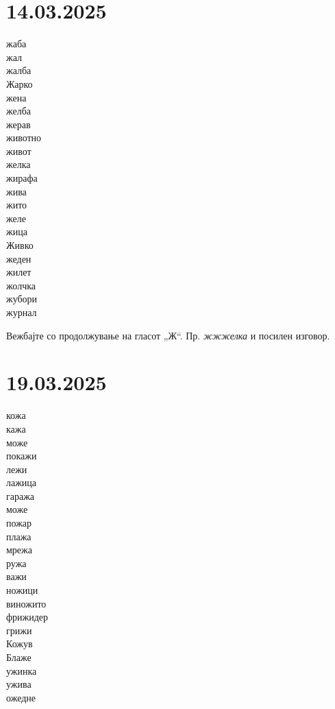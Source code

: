 \documentclass[a5paper,12pt]{article}
\newenvironment{activity}[1]{%
  \begin{tcolorbox}[colback=boxcolor,colframe=titlecolor,title={\textbf{#1}},fonttitle=\bfseries]
}{%
  \end{tcolorbox}
}
\newenvironment{instruction}{%
  \begin{tcolorbox}[colback=white,colframe=accentcolor,title={\textbf{Инструкции}},fonttitle=\bfseries] 
}{%
  \end{tcolorbox}
}
\begin{document}
\section{14.03.2025}
\begin{activity}{Зборчиња}
\begin{multicols}{4}
жаба\\ жал\\ жалба\\ Жарко\\ жена\\ желба\\ жерав\\ животно\\ живот\\ желка\\ жирафа\\ жива\\ жито\\ желе\\ жица\\ Живко\\ жеден\\ жилет\\ жолчка\\ жубори\\ журнал
\end{multicols}
\end{activity}

\begin{instruction}
Вежбајте со продолжување на гласот „Ж“. Пр. \emph{жжжелка} и посилен изговор.
\end{instruction}

\section{19.03.2025}
\begin{activity}{Зборчиња}
\begin{multicols}{4}
кожа\\ кажа\\ може\\ покажи\\ лежи\\ лажица\\ гаража\\ може\\ пожар\\ плажа\\ мрежа\\ ружа\\ важи\\ ножици\\ виножито\\ фрижидер\\ грижи\\ Кожув\\ Блаже\\ ужинка\\ ужива\\ ожедне
\end{multicols}
\end{activity}
\end{document}
